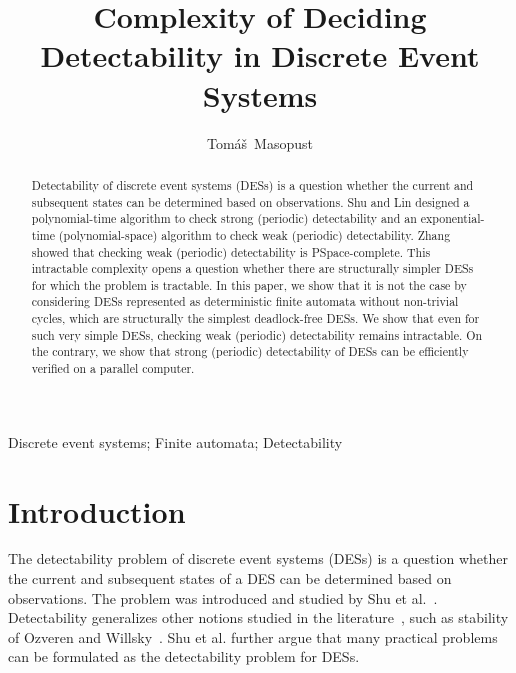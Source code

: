 \documentclass[twocolumn,amsthm]{autartx}
\begin{document}
\begin{frontmatter}
\title{Complexity of Deciding Detectability in Discrete Event Systems}

\author{Tom{\' a}{\v s}~Masopust}
\address{Institute of Mathematics, Czech Academy of Sciences, {\v Z}i{\v z}kova 22, 616 62 Brno, Czechia}

\begin{keyword} %
  Discrete event systems; Finite automata; Detectability
\end{keyword}

\begin{abstract}
  Detectability of discrete event systems (DESs) is a question whether the current and subsequent states can be determined based on observations. Shu and Lin designed a polynomial-time algorithm to check strong (periodic) detectability and an exponential-time (polynomial-space) algorithm to check weak (periodic) detectability. Zhang showed that checking weak (periodic) detectability is PSpace-complete. This intractable complexity opens a question whether there are structurally simpler DESs for which the problem is tractable. In this paper, we show that it is not the case by considering DESs represented as deterministic finite automata without non-trivial cycles, which are structurally the simplest deadlock-free DESs. We show that even for such very simple DESs, checking weak (periodic) detectability remains intractable. On the contrary, we show that strong (periodic) detectability of DESs can be efficiently verified on a parallel computer.
\end{abstract} 

\end{frontmatter}


\section{Introduction}
  The detectability problem of discrete event systems (DESs) is a question whether the current and subsequent states of a DES can be determined based on observations. The problem was introduced and studied by Shu et al.~\cite{ShuLin2011,ShuLinYing2007}. Detectability generalizes other notions studied in the literature~\cite{CainesGW1988,Ramadge1986}, such as stability of Ozveren and Willsky~\cite{OzverenW1990}. Shu et al. further argue that many practical problems can be formulated as the detectability problem for DESs.
  
\end{document}
